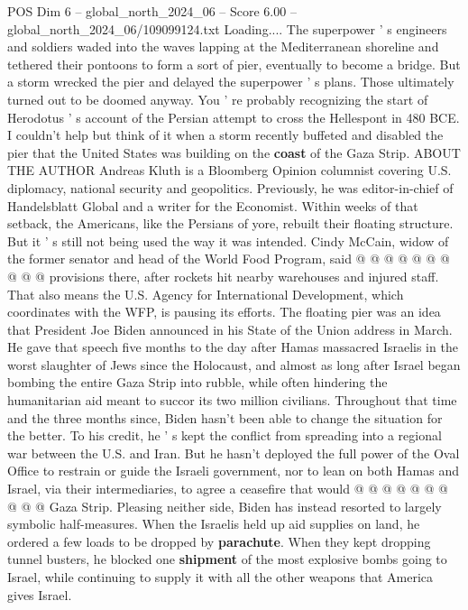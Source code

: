 \begin{textsample}{POS Dim 6 – global\_north\_2024\_06 – Score 6.00 – global\_north\_2024\_06/109099124.txt}  \label{ex:f6_pos_146}
Loading....
The superpower ' s engineers and soldiers waded into the waves lapping at the Mediterranean shoreline and tethered their pontoons to form a sort of pier, eventually to become a bridge.
But a storm wrecked the pier and delayed the superpower ' s plans.
Those ultimately turned out to be doomed anyway.
You ' re probably recognizing the start of Herodotus ' s account of the Persian attempt to cross the Hellespont in 480 BCE.
I couldn't help but think of it when a storm recently buffeted and disabled the pier that the United States was building on the \textbf{coast} of the Gaza Strip.
ABOUT THE AUTHOR Andreas Kluth is a Bloomberg Opinion columnist covering U.S. diplomacy, national security and geopolitics.
Previously, he was editor-in-chief of Handelsblatt Global and a writer for the Economist.
Within weeks of that setback, the Americans, like the Persians of yore, rebuilt their floating structure.
But it ' s still not being used the way it was intended.
Cindy McCain, widow of the former senator and head of the World Food Program, said @ @ @ @ @ @ @ @ @ @ provisions there, after rockets hit nearby warehouses and injured staff.
That also means the U.S.
Agency for International Development, which coordinates with the WFP, is pausing its efforts.
The floating pier was an idea that President Joe Biden announced in his State of the Union address in March.
He gave that speech five months to the day after Hamas massacred Israelis in the worst slaughter of Jews since the Holocaust, and almost as long after Israel began bombing the entire Gaza Strip into rubble, while often hindering the humanitarian aid meant to succor its two million civilians.
Throughout that time and the three months since, Biden hasn't been able to change the situation for the better.
To his credit, he ' s kept the conflict from spreading into a regional war between the U.S. and Iran.
But he hasn't deployed the full power of the Oval Office to restrain or guide the Israeli government, nor to lean on both Hamas and Israel, via their intermediaries, to agree a ceasefire that would @ @ @ @ @ @ @ @ @ @ Gaza Strip.
Pleasing neither side, Biden has instead resorted to largely symbolic half-measures.
When the Israelis held up aid supplies on land, he ordered a few loads to be dropped by \textbf{parachute}.
When they kept dropping tunnel busters, he blocked one \textbf{shipment} of the most explosive bombs going to Israel, while continuing to supply it with all the other weapons that America gives Israel.

\end{textsample}
